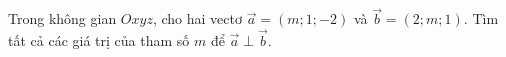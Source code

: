 \begin{ex}
Trong không gian $Oxyz$, cho hai vectơ $\vec{a}=(m;1;-2)$ và $\vec{b}=(2;m;1)$. Tìm tất cả các giá trị của tham số $m$ để $\vec{a}\perp\vec{b}$.
\end{ex}
